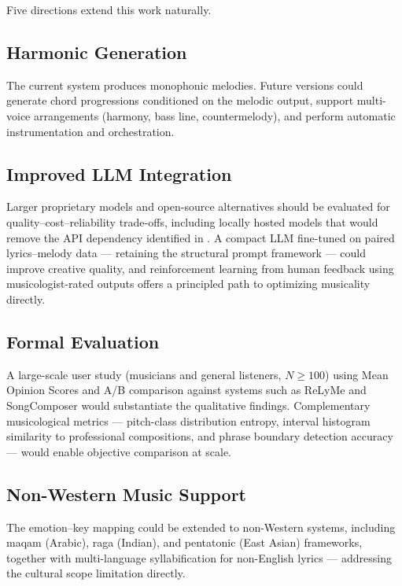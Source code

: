 Five directions extend this work naturally.

\subsection{Harmonic Generation}

The current system produces monophonic melodies. Future versions could
generate chord progressions conditioned on the melodic output, support
multi-voice arrangements (harmony, bass line, countermelody), and perform
automatic instrumentation and orchestration.

\subsection{Improved LLM Integration}

Larger proprietary models and open-source alternatives should be evaluated
for quality--cost--reliability trade-offs, including locally hosted models
that would remove the API dependency identified in
. A compact LLM fine-tuned on paired
lyrics--melody data --- retaining the structural prompt framework ---
could improve creative quality, and reinforcement learning from human
feedback using musicologist-rated outputs offers a principled path to
optimizing musicality directly.

\subsection{Formal Evaluation}

A large-scale user study (musicians and general listeners, $N \geq 100$)
using Mean Opinion Scores and A/B comparison against systems such as ReLyMe
\cite{zhang22relyme} and SongComposer \cite{ding24songcomposer} would
substantiate the qualitative findings. Complementary musicological metrics
--- pitch-class distribution entropy, interval histogram similarity to
professional compositions, and phrase boundary detection accuracy --- would
enable objective comparison at scale.

\subsection{Non-Western Music Support}

The emotion--key mapping could be extended to non-Western systems, including
maqam (Arabic), raga (Indian), and pentatonic (East Asian) frameworks,
together with multi-language syllabification for non-English lyrics ---
addressing the cultural scope limitation directly.

